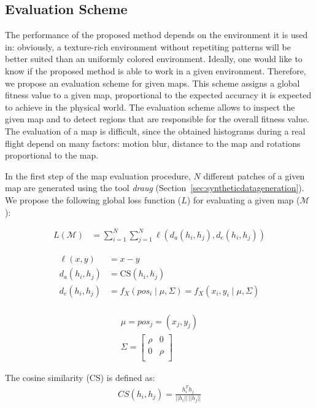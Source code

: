 \subsection{Evaluation Scheme}
\label{sec:evaluationscheme}

The performance of the proposed method depends
on the environment it is used in: obviously, a texture-rich environment without repetiting patterns will be better suited than an uniformly colored environment. Ideally, one would like to know if the proposed method is able to work in a given environment. Therefore, we propose an evaluation scheme for given
maps. This scheme assigns a global fitness value to a given map,
proportional to the expected accuracy it is expected to achieve in the physical
world. The evaluation scheme allows to inspect the given map and to detect
regions that are responsible for the overall fitness value. The evaluation of a map is
difficult, since the obtained histograms during a real flight depend
on many factors: motion blur, distance to the map and rotations
proportional to the map.

In the first step of the map evaluation procedure, $N$ different
patches of a given map are generated using the tool \emph{draug}
(Section~\ref{sec:syntheticdatageneration}). We propose the following global loss function
($L$) for evaluating a given map ($\mathcal{M}$):

\begin{align}
  L(\mathcal{M}) &= \sum_{i = 1}^{N} \sum_{j = 1}^{N} \ell(d_a(h_i, h_j), d_e(h_i, h_j))
\end{align}

\begin{align}
  \ell(x, y) &= x - y\\
  d_a(h_i, h_j) &= \text{CS}(h_i, h_j)\\
  d_e(h_i, h_j) &= f_X(pos_i \mid \mu, \Sigma) = f_X(x_i, y_i \mid \mu, \Sigma)\\
\end{align}

\begin{align}
\mu = pos_j = (x_j, y_j)\\
\Sigma =
  \begin{bmatrix}
    \rho & 0\\
    0 & \rho\\
  \end{bmatrix}
\end{align}

The cosine similarity (CS) is defined as:
\begin{align}
CS(h_i, h_j) = \frac{h_i^Th_j}{||h_i||\,||h_j||}
\end{align}

